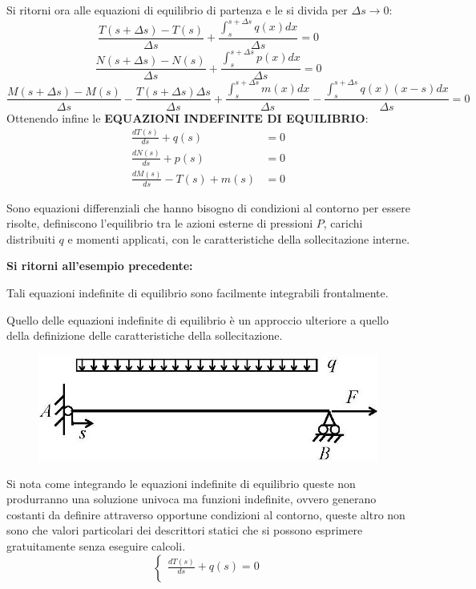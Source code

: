 \documentclass{article}
\begin{document}
\begin{adjustwidth}{2in}{}
	Si ritorni ora alle equazioni di equilibrio di partenza e le si divida per  $\Delta s\rightarrow 0$: \newline
	\[
	\frac{T(s+\Delta s) - T(s)}{\Delta s} + \frac{\int_{s}^{s+\Delta s} q(x)dx}{\Delta s} = 0
	\]
	\[
	\frac{N(s+\Delta s) - N(s)}{\Delta s} + \frac{\int_{s}^{s+\Delta s} p(x)dx}{\Delta s} = 0
	\]
	\[
	\frac{	M(s+\Delta s) - M(s)}{\Delta s} -\frac{T(s+\Delta s)\Delta s}{\Delta s} + \frac{\int_{s}^{s+\Delta s} m(x)dx}{\Delta s} - \frac{\int_{s}^{s+\Delta s} q(x)(x-s)dx}{\Delta s} = 0
	\]
	Ottenendo infine le \textbf{EQUAZIONI INDEFINITE DI EQUILIBRIO}:
	\[
	\boxed{\begin{aligned}
		\frac{dT(s)}{ds} +  q(s) & = 0 \\
		\frac{dN(s)}{ds} + p(s) & = 0 \\
		\frac{dM(s)}{ds} - T(s) +  m(s) & = 0
	\end{aligned}}
	\]
	
	Sono equazioni differenziali che hanno bisogno di condizioni al contorno per essere risolte, definiscono l'equilibrio tra le azioni esterne di pressioni $P$, carichi distribuiti $q$ e momenti applicati, con le caratteristiche della sollecitazione interne. \newline 
	
\begin{center}
		\textbf{Si ritorni all'esempio precedente:}
\end{center}
	
	Tali equazioni indefinite di equilibrio sono facilmente integrabili frontalmente. \newline 
	
	Quello delle equazioni indefinite di equilibrio è un approccio ulteriore a quello della definizione delle caratteristiche della sollecitazione.
	
\begin{figure}[H]
	\centering
	\includegraphics[width=0.4\linewidth]{"immagini/1.PARTE5_Pagina_11"}
\end{figure}
	
	Si nota come integrando le equazioni indefinite di equilibrio queste non produrranno una soluzione univoca ma funzioni indefinite, ovvero generano costanti da definire attraverso opportune condizioni al contorno, queste altro non sono che valori particolari dei descrittori statici che si possono esprimere gratuitamente senza eseguire calcoli.
	\[
	\begin{cases}
		\frac{dT(s)}{ds} +  q(s) = 0 \\
		

\end{cases}\]
\end{adjustwidth}
\end{document}
